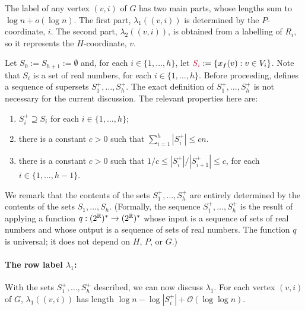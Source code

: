 \documentclass{patmorin}
\makeatletter
\renewcommand{\le}{\leqslant}
\newcommand{\defin}[1]{\emph{\textcolor{brightmaroon}{#1}}}
\def\mathcolor#1#{\@mathcolor{#1}}
\def\@mathcolor#1#2#3{%
  \protect\leavevmode
  \begingroup
    \color#1{#2}#3%
  \endgroup
}
\newcommand{\mathdefin}[1]{\mathcolor{brightmaroon}{#1}}
\newcommand{\Oh}{\mathcal{O}}
\makeatother
\begin{document}


  The label of any vertex $(v,i)$ of $G$ has two main parts, whose lengths sum to $\log n+o(\log n)$.
  The first part, $\lambda_1((v,i))$ is determined by the $P$-coordinate, $i$.
  The second part, $\lambda_2((v,i))$, is obtained from a labelling of $R_i$, so it represents the $H$-coordinate, $v$.

  Let $S_0:=S_{h+1}:=\emptyset$ and,
  for each $i\in\{1,\ldots,h\}$, let $\mathdefin{S_i}:=\{x_f(v):v\in V_i\}$.
  Note that $S_i$ is a set of real numbers, for each $i\in\{1,\ldots,h\}$.
  Before proceeding, \cite{dujmovic.esperet.ea:adjacency} defines a sequence of supersets \defin{$S^+_1,\ldots,S^+_h$}. The exact definition of $S^+_1,\ldots,S^+_h$ is not necessary for the current discussion.
  The relevant properties here are:
  \begin{enumerate}[nosep,label=(\alph*)]
      \item\label{plus_superset} $S^+_i\supseteq S_i$ for each $i\in\{1,\ldots,h\}$;
      \item\label{plus_size} there is a constant $c>0$ such that $\sum_{i=1}^h |S^+_i|\le cn$.
      \item\label{plus_ratio} there is a constant $c>0$ such that
      $1/c\le |S^+_i|/|S^+_{i+1}|\le c$, for each $i\in\{1,\ldots,h-1\}$.
  \end{enumerate}
  We remark that the contents of the sets $S^+_1,\ldots,S^+_h$ are entirely determined by the contents of the sets $S_1,\ldots,S_h$.
  (Formally, the sequence $S^+_1,\ldots,S^+_h$ is the result of applying a function $q:(2^{\mathbb{R}})^*\to (2^{\mathbb{R}})^*$ whose input is a sequence of sets of real numbers and whose output is a sequence of sets of real numbers. The function $q$ is universal; it does not depend on $H$, $P$, or $G$.)

  \paragraph{\boldmath The row label $\lambda_1$:}
  With the sets $S^+_1,\ldots,S^+_h$ described, we can now discuss $\lambda_1$.
  For each vertex $(v,i)$ of $G$, $\lambda_1((v,i))$ has length $\log n - \log |S^+_i| + \Oh(\log\log n)$.
\end{document}
